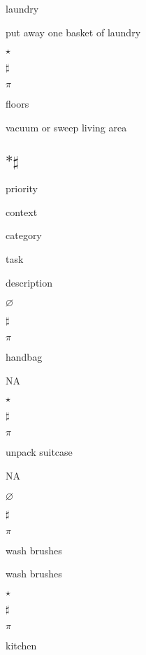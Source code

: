 \documentclass[]{book}
\newenvironment{Shaded}{\begin{snugshade}}{\end{snugshade}}
\newcommand{\KeywordTok}[1]{\textcolor[rgb]{0.13,0.29,0.53}{\textbf{#1}}}
\newcommand{\NormalTok}[1]{#1}
\newcommand{\OperatorTok}[1]{\textcolor[rgb]{0.81,0.36,0.00}{\textbf{#1}}}
\newcommand{\StringTok}[1]{\textcolor[rgb]{0.31,0.60,0.02}{#1}}
\begin{document}
laundry

put away one basket of laundry

\(\star\)

\(\sharp\)

\(\pi\)

floors

vacuum or sweep living area

\hypertarget{housework}{%
\subsection{\texorpdfstring{\(* \sharp\)}{* \textbackslash{}sharp}}\label{housework}}

\begin{Shaded}
\end{Shaded}

priority

context

category

task

description

\(\varnothing\)

\(\sharp\)

\(\pi\)

handbag

NA

\(\star\)

\(\sharp\)

\(\pi\)

unpack suitcase

NA

\(\varnothing\)

\(\sharp\)

\(\pi\)

wash brushes

wash brushes

\(\star\)

\(\sharp\)

\(\pi\)

kitchen
\end{document}
